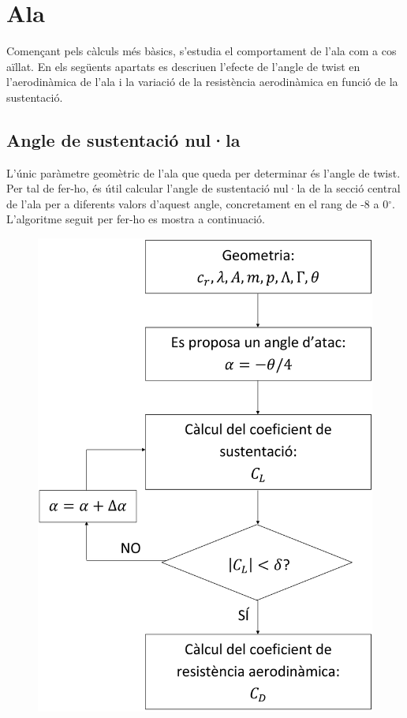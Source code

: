 \chapter{Ala}
Començant pels càlculs més bàsics, s'estudia el comportament de l'ala com a cos aïllat. En els següents apartats es descriuen l'efecte de l'angle de twist en l'aerodinàmica de l'ala i la variació de la resistència aerodinàmica en funció de la sustentació.

\section{Angle de sustentació nul·la}
L'únic paràmetre geomètric de l'ala que queda per determinar és l'angle de twist. Per tal de fer-ho, és útil calcular l'angle de sustentació nul·la de la secció central de l'ala per a diferents valors d'aquest angle, concretament en el rang de -8 a 0$^{\circ}$. L'algoritme seguit per fer-ho es mostra a continuació.
\begin{figure}[H]
	\centering
	\includegraphics[scale=0.1]{./plots/algoritmeZLangle}
\end{figure}


